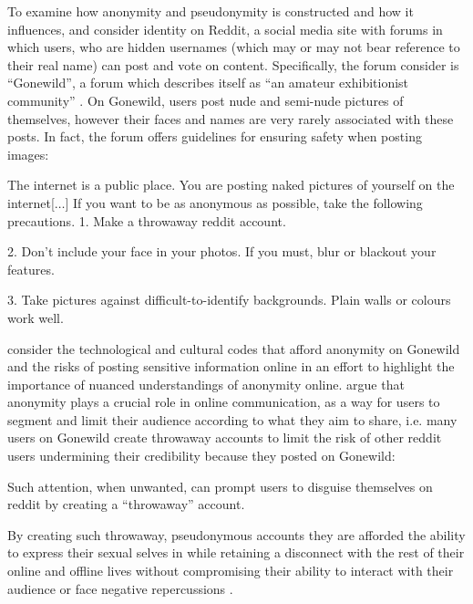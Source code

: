 To examine how anonymity and pseudonymity is constructed and how it influences, \cite{Nagel:2015} and \cite{Nagel:2013} consider identity on Reddit, a social media site with forums in which users, who are hidden usernames (which may or may not bear reference to their real name) can post and vote on content. Specifically, the forum \cite{Nagel:2013,Nagel:2015} consider is ``Gonewild'', a forum which describes itself as ``an amateur exhibitionist community'' \citep{Nagel:2015}. On Gonewild, users post nude and semi-nude pictures of themselves, however their faces and names are very rarely associated with these posts. In fact, the forum offers guidelines for ensuring safety when posting images:

\begin{aquote}{\cite{Nagel:2013}}
The internet is a public place. You are posting naked pictures of yourself on the internet[$\ldots$] If you want to be as anonymous as possible, take the following precautions.
1. Make a throwaway reddit account.

2. Don't include your face in your photos. If you must, blur or blackout your features.

3. Take pictures against difficult-to-identify backgrounds. Plain walls or colours work well.
\end{aquote}

\cite{Nagel:2013} consider the technological and cultural codes that afford anonymity on Gonewild and the risks of posting sensitive information online in an effort to highlight the importance of nuanced understandings of anonymity online. \cite{Nagel:2013} argue that anonymity plays a crucial role in online communication, as a way for users to segment and limit their audience according to what they aim to share, i.e. many users on Gonewild create throwaway accounts to limit the risk of other reddit users undermining their credibility because they posted on Gonewild:

\begin{aquote}{\cite{Nagel:2013}}
Such attention, when unwanted, can prompt users to disguise themselves on reddit by creating a ``throwaway'' account.
\end{aquote}

By creating such throwaway, pseudonymous accounts they are afforded the ability to express their sexual selves in while retaining a disconnect with the rest of their online and offline lives without compromising their ability to interact with their audience or face negative repercussions \citep{Nagel:2015}.\vspace{5mm}

